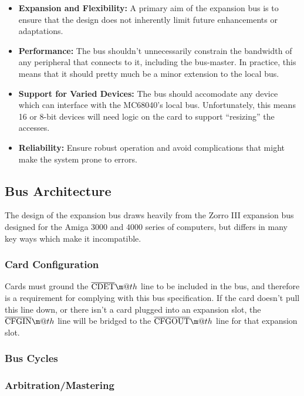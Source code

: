 \documentclass{article}
\makeatletter
\newcommand*{\textoverline}[1]{$\overline{\hbox{#1}}\m@th$}
\makeatother
\begin{document}
\begin{itemize}
	\item \textbf{Expansion and Flexibility:} A primary aim of the expansion
	bus is to ensure that the design does not inherently limit future
	enhancements or adaptations.

	\item \textbf{Performance:} The bus shouldn't unnecessarily constrain
	the bandwidth of any peripheral that connects to it, including the
	bus-master. In practice, this means that it should pretty much be a
	minor extension to the local bus.

	\item \textbf{Support for Varied Devices:} The bus should accomodate any
	device which can interface with the MC68040's local bus. Unfortunately,
	this means 16 or 8-bit devices will need logic on the card to support
	``resizing'' the accesses.

	\item \textbf{Reliability:} Ensure robust operation and avoid
	complications that might make the system prone to errors.
\end{itemize}

\subsection{Bus Architecture}

The design of the expansion bus draws heavily from the Zorro III expansion bus
designed for the Amiga 3000 and 4000 series of computers, but differs in many
key ways which make it incompatible.

\subsubsection{Card Configuration}

Cards must ground the \textoverline{CDET} line to be included in the
bus, and therefore is a requirement for complying with this bus specification.
If the card doesn't pull this line down, or there isn't a card plugged into an
expansion slot, the \textoverline{CFGIN} line will be bridged to the
\textoverline{CFGOUT} line for that expansion slot.

\subsubsection{Bus Cycles}

\subsubsection{Arbitration/Mastering}
\end{document}
